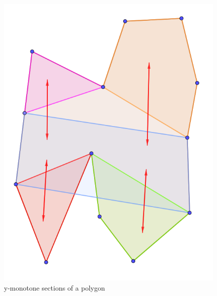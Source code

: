\documentclass[12pt]{article}
\begin{document}
\begin{figure}[H]
  \includegraphics[width=\linewidth]{Images/intersection_yMonotoneSections.png}
  \caption{y-monotone sections of a polygon}
  \label{fig:intersectionPolygonSections}
\endminipage
\end{figure}
\end{document}
